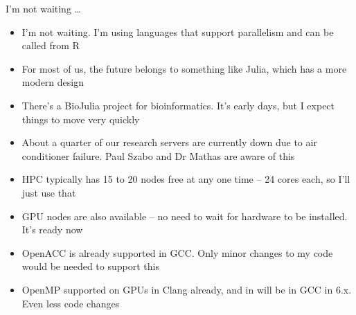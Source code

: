 \documentclass{beamer}
\begin{document}
\begin{frame}{I'm not waiting \ldots}
\begin{itemize}
\item I'm not waiting. I'm using languages that support parallelism and can be called from R
\item For most of us, the future belongs to something like Julia, which has a more modern design
\item There's a BioJulia project for bioinformatics. It's early days, but I expect things to move very quickly
\item About a quarter of our research servers are currently down due to air conditioner failure.
			Paul Szabo and Dr	Mathas are aware of this
\item HPC typically has 15 to 20 nodes free at any one time -- 24 cores each, so I'll just use that
\item GPU nodes are also available -- no need to wait for hardware to be installed. It's ready now
\item OpenACC is already supported in GCC. Only minor changes to my code would be needed to support this
\item OpenMP supported on GPUs in Clang already, and in will be in GCC in 6.x. Even less code changes
\end{itemize}
\end{frame}
\end{document}
